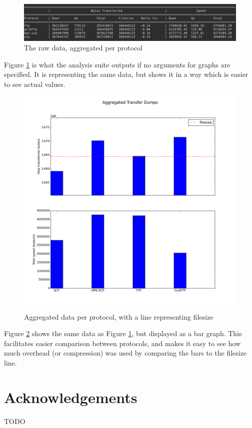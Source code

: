 \documentclass{sig-alternate-05-2015}
\begin{document}
\begin{figure}
	\centering
	\includegraphics[width=\textwidth]{img/testdata_detail.png}
	\caption{The raw data, aggregated per protocol
	         \label{fig:testdata_detail}}
\end{figure}
Figure \ref{fig:testdata_detail} is what the analysis suite outputs if no arguments for graphs are specified. It is representing the same data, but shows it in a way which is easier to see actual values.

\begin{figure}
	\centering
	\includegraphics[width=\textwidth]{img/testdata_aggregate.png}
	\caption{Aggregated data per protocol, with a line representing filesize
	         \label{fig:testdata_aggregate}}
\end{figure}

Figure \ref{fig:testdata_aggregate} shows the same data as Figure \ref{fig:testdata_detail}, but displayed as a bar graph. This facilitates easier comparison between protocols, and makes it easy to see how much overhead (or compression) was used by comparing the bars to the filesize line.

\section{Acknowledgements}
TODO


 
\end{document}
